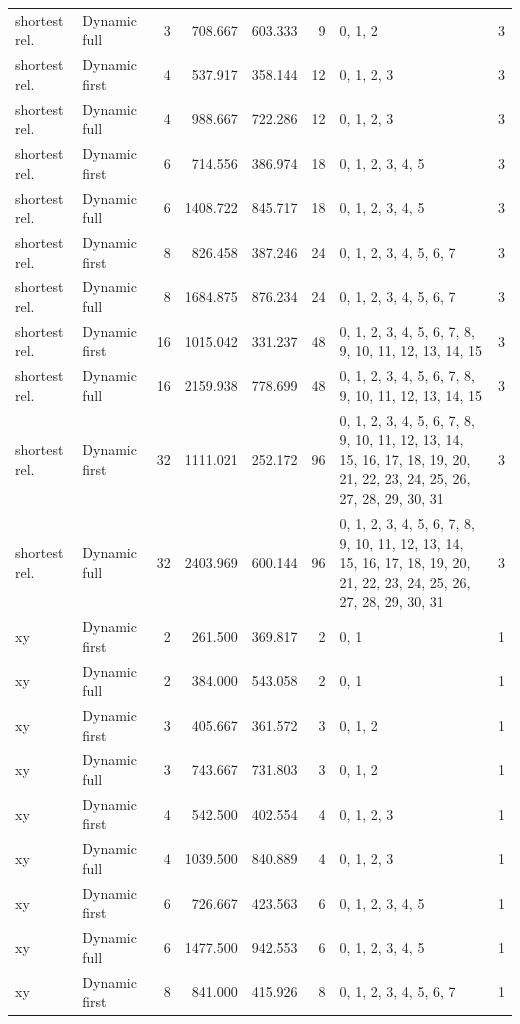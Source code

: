 \documentclass[10pt,a4paper]{article}
\begin{document}
\begin{longtable}{@{}p{23mm}p{29mm}rrrrp{36mm}r@{}}
shortest rel. & Dynamic full & 3 & 708.667 & 603.333 & 9 & 0, 1, 2 & 3 \\
shortest rel. & Dynamic first & 4 & 537.917 & 358.144 & 12 & 0, 1, 2, 3 & 3 \\
shortest rel. & Dynamic full & 4 & 988.667 & 722.286 & 12 & 0, 1, 2, 3 & 3 \\
shortest rel. & Dynamic first & 6 & 714.556 & 386.974 & 18 & 0, 1, 2, 3, 4, 5 & 3 \\
shortest rel. & Dynamic full & 6 & 1408.722 & 845.717 & 18 & 0, 1, 2, 3, 4, 5 & 3 \\
shortest rel. & Dynamic first & 8 & 826.458 & 387.246 & 24 & 0, 1, 2, 3, 4, 5, 6, 7 & 3 \\
shortest rel. & Dynamic full & 8 & 1684.875 & 876.234 & 24 & 0, 1, 2, 3, 4, 5, 6, 7 & 3 \\
shortest rel. & Dynamic first & 16 & 1015.042 & 331.237 & 48 & 0, 1, 2, 3, 4, 5, 6, 7, 8, 9, 10, 11, 12, 13, 14, 15 & 3 \\
shortest rel. & Dynamic full & 16 & 2159.938 & 778.699 & 48 & 0, 1, 2, 3, 4, 5, 6, 7, 8, 9, 10, 11, 12, 13, 14, 15 & 3 \\
shortest rel. & Dynamic first & 32 & 1111.021 & 252.172 & 96 & 0, 1, 2, 3, 4, 5, 6, 7, 8, 9, 10, 11, 12, 13, 14, 15, 16, 17, 18, 19, 20, 21, 22, 23, 24, 25, 26, 27, 28, 29, 30, 31 & 3 \\
shortest rel. & Dynamic full & 32 & 2403.969 & 600.144 & 96 & 0, 1, 2, 3, 4, 5, 6, 7, 8, 9, 10, 11, 12, 13, 14, 15, 16, 17, 18, 19, 20, 21, 22, 23, 24, 25, 26, 27, 28, 29, 30, 31 & 3 \\
xy & Dynamic first & 2 & 261.500 & 369.817 & 2 & 0, 1 & 1 \\
xy & Dynamic full & 2 & 384.000 & 543.058 & 2 & 0, 1 & 1 \\
xy & Dynamic first & 3 & 405.667 & 361.572 & 3 & 0, 1, 2 & 1 \\
xy & Dynamic full & 3 & 743.667 & 731.803 & 3 & 0, 1, 2 & 1 \\
xy & Dynamic first & 4 & 542.500 & 402.554 & 4 & 0, 1, 2, 3 & 1 \\
xy & Dynamic full & 4 & 1039.500 & 840.889 & 4 & 0, 1, 2, 3 & 1 \\
xy & Dynamic first & 6 & 726.667 & 423.563 & 6 & 0, 1, 2, 3, 4, 5 & 1 \\
xy & Dynamic full & 6 & 1477.500 & 942.553 & 6 & 0, 1, 2, 3, 4, 5 & 1 \\
xy & Dynamic first & 8 & 841.000 & 415.926 & 8 & 0, 1, 2, 3, 4, 5, 6, 7 & 1 \\

\end{longtable}
\end{document}
